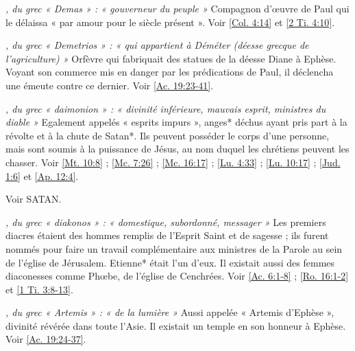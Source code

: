 \begin{multicols}{2}
\textit{, du grec « Demas » : « gouverneur du peuple »}\newline
Compagnon d'œuvre de Paul qui le délaissa « par amour pour le siècle présent ». Voir \vref{Col. 4:14} et \vref{2 Ti. 4:10}.

\textit{, du grec « Demetrios » : « qui appartient à Déméter (déesse grecque de l'agriculture) »}\newline
Orfèvre qui fabriquait des statues de la déesse Diane à Ephèse. Voyant son commerce mis en danger par les prédications de Paul, il déclencha une émeute contre ce dernier. Voir \vref{Ac. 19:23-41}.

\textit{, du grec « daimonion » : « divinité inférieure, mauvais esprit, ministres du diable »}\newline
Egalement appelés « esprits impurs », anges* déchus ayant pris part à la révolte et à la chute de Satan*. Ils peuvent posséder le corps d'une personne, mais sont soumis à la puissance de Jésus, au nom duquel les chrétiens peuvent les chasser. Voir \vref{Mt. 10:8} ; \vref{Mc. 7:26} ; \vref{Mc. 16:17} ; \vref{Lu. 4:33} ; \vref{Lu. 10:17} ; \vref{Jud. 1:6} et \vref{Ap. 12:4}.

\textit{}\newline
Voir SATAN.

\textit{, du grec « diakonos » : « domestique, subordonné, messager »}\newline
Les premiers diacres étaient des hommes remplis de l'Esprit Saint et de sagesse ; ils furent nommés pour faire un travail complémentaire aux ministres de la Parole au sein de l'église de Jérusalem. Etienne* était l'un d'eux. Il existait aussi des femmes diaconesses comme Phœbe, de l'église de Cenchrées. Voir \vref{Ac. 6:1-8} ; \vref{Ro. 16:1-2} et \vref{1 Ti. 3:8-13}.

\textit{, du grec « Artemis » : « de la lumière »}\newline
Aussi appelée « Artemis d'Ephèse », divinité révérée dans toute l'Asie. Il existait un temple en son honneur à Ephèse. Voir \vref{Ac. 19:24-37}.


\end{multicols}
